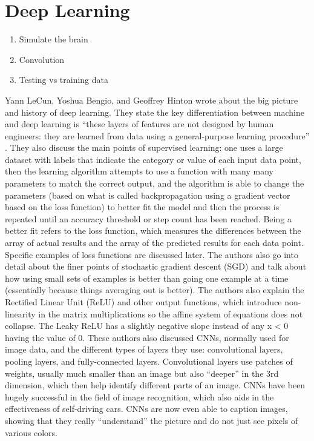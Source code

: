 \documentclass[]{report}
\begin{document}
\section{Deep Learning}
\begin{enumerate}
	\item Simulate the brain
	\item Convolution
	\item Testing vs training data
\end{enumerate}


Yann LeCun, Yoshua Bengio, and Geoffrey Hinton wrote about the big picture and history of deep learning. They state the key differentiation between machine and deep learning is “these layers of features are not designed by human engineers: they are learned from data using a general-purpose learning procedure” \cite{ThreeGiants}. 
They also discuss the main points of supervised learning: one uses a large dataset with labels that indicate the category or value of each input data point, then the learning algorithm attempts to use a function with many many parameters to match the correct output, and the algorithm is able to change the parameters (based on what is called backpropagation using a gradient vector based on the loss function) to better fit the model and then the process is repeated until an accuracy threshold or step count has been reached. Being a better fit refers to the loss function, which measures the differences between the array of actual results and the array of the predicted results for each data point. Specific examples of loss functions are discussed later.
The authors also go into detail about the finer points of stochastic gradient descent (SGD) and talk about how using small sets of examples is better than going one example at a time (essentially because things averaging out is better). The authors also explain the Rectified Linear Unit (ReLU) and other output functions, which introduce non-linearity in the matrix multiplications so the affine system of equations does not collapse. The Leaky ReLU has a slightly negative slope instead of any x < 0 having the value of 0.
These authors also discussed CNNs, normally used for image data, and the different types of layers they use: convolutional layers, pooling layers, and fully-connected layers. Convolutional layers use patches of weights, usually much smaller than an image but also “deeper” in the 3rd dimension, which then help identify different parts of an image. CNNs have been hugely successful in the field of image recognition, which also aids in the effectiveness of self-driving cars. CNNs are now even able to caption images, showing that they really “understand” the picture and do not just see pixels of various colors.
\end{document}
